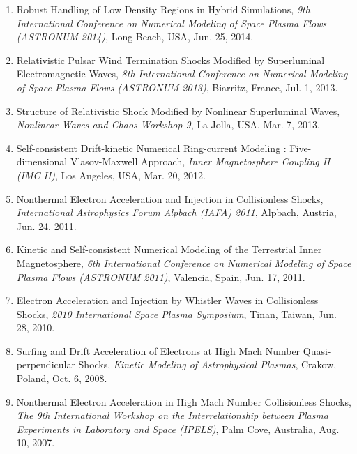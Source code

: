 \documentclass[lualatex,a4paper,ja=standard]{scrartcl}
\newcommand{\TalkEntry}[3]{
\item #1, \textit{#2}, #3.}
\begin{document}
\begin{enumerate}
\TalkEntry
{Robust Handling of Low Density Regions in Hybrid Simulations}
{9th International Conference on Numerical Modeling of Space Plasma Flows (ASTRONUM 2014)}
{Long Beach, USA, Jun. 25, 2014}

\TalkEntry
{Relativistic Pulsar Wind Termination Shocks Modified by Superluminal Electromagnetic Waves}
{8th International Conference on Numerical Modeling of Space Plasma Flows (ASTRONUM 2013)}
{Biarritz, France, Jul. 1, 2013}

\TalkEntry
{Structure of Relativistic Shock Modified by Nonlinear Superluminal Waves}
{Nonlinear Waves and Chaos Workshop 9}
{La Jolla, USA, Mar. 7, 2013}

\TalkEntry
{Self-consistent Drift-kinetic Numerical Ring-current Modeling : Five-dimensional Vlasov-Maxwell Approach}
{Inner Magnetosphere Coupling II (IMC II)}
{Los Angeles, USA, Mar. 20, 2012}

\TalkEntry
{Nonthermal Electron Acceleration and Injection in Collisionless Shocks}
{International Astrophysics Forum Alpbach (IAFA) 2011}
{Alpbach, Austria, Jun. 24, 2011}

\TalkEntry
{Kinetic and Self-consistent Numerical Modeling of the Terrestrial Inner Magnetosphere}
{6th International Conference on Numerical Modeling of Space Plasma Flows (ASTRONUM 2011)}
{Valencia, Spain, Jun. 17, 2011}

\TalkEntry
{Electron Acceleration and Injection by Whistler Waves in Collisionless Shocks}
{2010 International Space Plasma Symposium}
{Tinan, Taiwan, Jun. 28, 2010}

\TalkEntry
{Surfing and Drift Acceleration of Electrons at High Mach Number Quasi-perpendicular Shocks}
{Kinetic Modeling of Astrophysical Plasmas}
{Crakow, Poland, Oct. 6, 2008}

\TalkEntry
{Nonthermal Electron Acceleration in High Mach Number Collisionless Shocks}
{The 9th International Workshop on the Interrelationship between Plasma Experiments in Laboratory and Space (IPELS)}
{Palm Cove, Australia, Aug. 10, 2007}

\end{enumerate}
\end{document}
